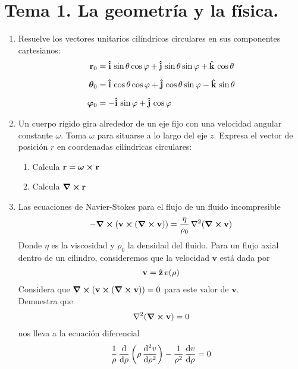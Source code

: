\section{Tema 1. La geometría y la física.}
\begin{enumerate}
\item Resuelve los vectores unitarios cilíndricos circulares en sus componentes cartesianos:
\begin{align*}
\vb{r}_{0} &= \vu{i} \, \sin \theta \cos \varphi + \vu{j} \, \sin \theta \sin \varphi + \vu{k} \, \cos \theta \\[0.5em]
\bm{\theta}_{0} &= \vu{i} \, \cos \theta \cos \varphi + \vu{j} \, \cos \theta \sin \varphi - \vu{k} \, \sin \theta \\[0.5em]
\bm{\varphi}_{0} &= - \vu{i} \, \sin \varphi + \vu{j} \, \cos \varphi
\end{align*}
\item Un cuerpo rígido gira alrededor de un eje fijo con una velocidad angular constante $\omega$. Toma $\omega$ para situarse a lo largo del eje $z$. Expresa el vector de posición $r$ en coordenadas cilíndricas circulares:
\begin{enumerate}
\item Calcula $\vb{r} = \bm{\omega} \cp \vb{r}$
\item Calcula $\curl{\vb{r}}$
\end{enumerate}
\item Las ecuaciones de Navier-Stokes para el flujo de un fluido incompresible
\begin{align*}
- \curl{( \mathbf{v} \cp (\curl{\vb{v}}))} =  \dfrac{\eta}{\rho_{0}} \, \laplacian{(\curl{\vb{v}})}
\end{align*}
Donde $\eta$ es la viscosidad y $\rho_{0}$ la densidad del fluido. Para un flujo axial dentro de un cilindro, consideremos que la velocidad $\mathbf{v}$ está dada por
\begin{align*}
\mathbf{v} =  \vu{z} \, v (\rho)
\end{align*}
Considera que $\curl{( \mathbf{v} \cp (\curl{\vb{v}}))} = 0$ 
para este valor de $\mathbf{v}$.
\\
Demuestra que
\begin{align*}
\laplacian{( \curl{\vb{v}} )} = 0
\end{align*}
nos lleva a la ecuación diferencial
\begin{align*}
\dfrac{1}{\rho} \, \dv{\rho} \left( \rho \, \dv[2]{v}{\rho} \right) -  \dfrac{1}{\rho^{2}} \, \dv{v}{\rho} = 0
\end{align*}

\end{enumerate}
